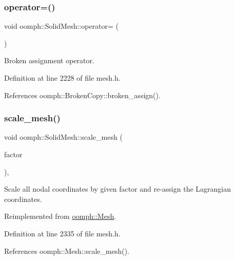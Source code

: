 \subsubsection{\texorpdfstring{operator=()}{operator=()}}
{\footnotesize\ttfamily void oomph\+::\+Solid\+Mesh\+::operator= (\begin{DoxyParamCaption}\item[{const \hyperlink{classoomph_1_1SolidMesh}{Solid\+Mesh} \&}]{ }\end{DoxyParamCaption})\hspace{0.3cm}{\ttfamily [inline]}}



Broken assignment operator. 



Definition at line 2228 of file mesh.\+h.



References oomph\+::\+Broken\+Copy\+::broken\+\_\+assign().

\mbox{\label{classoomph_1_1SolidMesh_a65a49a75f83674d7fbcf5c3ee05d7253}} 
\subsubsection{\texorpdfstring{scale\+\_\+mesh()}{scale\_mesh()}}
{\footnotesize\ttfamily void oomph\+::\+Solid\+Mesh\+::scale\+\_\+mesh (\begin{DoxyParamCaption}\item[{const double \&}]{factor }\end{DoxyParamCaption})\hspace{0.3cm}{\ttfamily [inline]}, {\ttfamily [virtual]}}



Scale all nodal coordinates by given factor and re-\/assign the Lagrangian coordinates. 



Reimplemented from \hyperlink{classoomph_1_1Mesh_a7e0d761fca70b856185b7b9b2168663d}{oomph\+::\+Mesh}.



Definition at line 2335 of file mesh.\+h.



References oomph\+::\+Mesh\+::scale\+\_\+mesh().

\mbox{\label{classoomph_1_1SolidMesh_a3eb52bbb81875244774cfc305c3ab21d}} 

